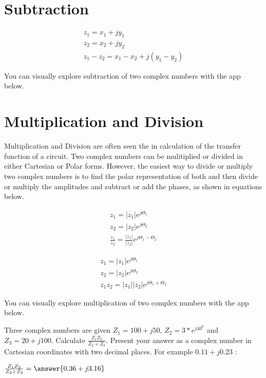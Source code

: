 \documentclass{ximera}
\begin{document}
\section{Subtraction}


\begin{eqnarray}
z_1=x_1 + j y_1 \nonumber \\
z_2=x_2 + j y_2 \nonumber \\
z_1-z_2 = x_1 - x_2 + j ( y_1 - y_2)
\end{eqnarray} 


You can visually explore subtraction of two complex numbers with the app below.
 \begin{center}  
\end{center} 

\section{Multiplication and Division}

Multiplication and Division are often seen the in calculation of the transfer function of a circuit. Two complex numbers can be mulitiplied or divided in either Cartesian or Polar forms. However, the easiest way to divide or multiply two complex numbers is to find the polar representation of both and then divide or multiply the amplitudes  and subtract or add the phases, as shown in equations below.



\begin{eqnarray}
z_1=|z_1| e^{j \Theta_1} \nonumber \\ 
z_2=|z_2| e^{j \Theta_2} \nonumber \\
\frac{z_1}{ z_2} = \frac{|z_1|}{|z_2|} e^{j \Theta_1 -\Theta_2}
\end{eqnarray}
  

\begin{eqnarray}
z_1=|z_1| e^{j \Theta_1} \nonumber \\
z_2=|z_2| e^{j \Theta_2} \nonumber \\
z_1 z_2 = |z_1||z_2| e^{j \Theta_1 +\Theta_2}
\end{eqnarray}



You can visually explore multiplication of two complex numbers with the app below.

    
   
 \begin{center}  
\end{center} 
    
    
\begin{question}
Three complex numbers are given $Z_1=100+j50$, $Z_2=3*e^{j40^0}$ and  $Z_3=20+j100$. Calculate $\frac{Z_1 Z_2}{Z_2+Z_3}$. Present your answer as a complex number in Cartesian coordinates with two decimal places. For example $0.11+j0.23$ :
  
$\frac{Z_1 Z_2}{Z_2+Z_3} = \answer{0.36+j3.16}$  
\end{question} 
\end{document}
